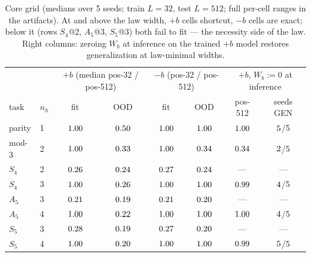 \documentclass[10pt]{article}
\begin{document}
\begin{table}[t]
\centering\small
\begin{tabular}{llcccccc}
\toprule
& & \multicolumn{2}{c}{$+b$ (median pos-32 / pos-512)} & \multicolumn{2}{c}{$-b$ (pos-32 / pos-512)} &
\multicolumn{2}{c}{$+b$, $W_b{:=}0$ at inference} \\
task & $n_h$ & fit & OOD & fit & OOD & pos-512 & seeds GEN \\
\midrule
parity & 1 & $1.00$ & $0.50$ & $1.00$ & $1.00$ & $1.00$ & $5$/5 \\
mod-3 & 2 & $1.00$ & $0.33$ & $1.00$ & $0.34$ & $0.34$ & $2$/5 \\
$S_4$ & 2 & $0.26$ & $0.24$ & $0.27$ & $0.24$ & --- & --- \\
$S_4$ & 3 & $1.00$ & $0.26$ & $1.00$ & $1.00$ & $0.99$ & $4$/5 \\
$A_5$ & 3 & $0.21$ & $0.19$ & $0.21$ & $0.20$ & --- & --- \\
$A_5$ & 4 & $1.00$ & $0.22$ & $1.00$ & $1.00$ & $1.00$ & $4$/5 \\
$S_5$ & 3 & $0.28$ & $0.19$ & $0.27$ & $0.20$ & --- & --- \\
$S_5$ & 4 & $1.00$ & $0.20$ & $1.00$ & $1.00$ & $0.99$ & $5$/5 \\
\bottomrule
\end{tabular}
\caption{Core grid (medians over 5 seeds; train $L{=}32$, test $L{=}512$; full per-cell ranges in the
artifacts). At and above the law width, $+b$ cells shortcut, $-b$ cells are exact; below it (rows
$S_4$@2, $A_5$@3, $S_5$@3) both fail to fit --- the necessity side of the law. Right columns: zeroing
$W_b$ at inference on the trained $+b$ model restores generalization at law-minimal widths.}
\label{tab:main}
\end{table}
\end{document}
